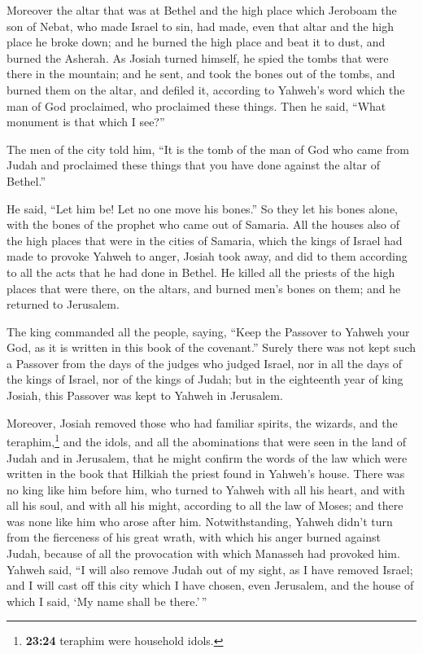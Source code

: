  Moreover the altar that was at Bethel and the high place
which Jeroboam the son of Nebat, who made Israel to sin, had made, even
that altar and the high place he broke down; and he burned the high
place and beat it to dust, and burned the Asherah.  As
Josiah turned himself, he spied the tombs that were there in the
mountain; and he sent, and took the bones out of the tombs, and burned
them on the altar, and defiled it, according to Yahweh's word which the
man of God proclaimed, who proclaimed these things.  Then
he said, ``What monument is that which I see?''

The men of the city told him, ``It is the tomb of the man of God who
came from Judah and proclaimed these things that you have done against
the altar of Bethel.''

 He said, ``Let him be! Let no one move his bones.'' So
they let his bones alone, with the bones of the prophet who came out of
Samaria.  All the houses also of the high places that
were in the cities of Samaria, which the kings of Israel had made to
provoke Yahweh to anger, Josiah took away, and did to them according to
all the acts that he had done in Bethel.  He killed all
the priests of the high places that were there, on the altars, and
burned men's bones on them; and he returned to Jerusalem.

 The king commanded all the people, saying, ``Keep the
Passover to Yahweh your God, as it is written in this book of the
covenant.''  Surely there was not kept such a Passover
from the days of the judges who judged Israel, nor in all the days of
the kings of Israel, nor of the kings of Judah;  but in
the eighteenth year of king Josiah, this Passover was kept to Yahweh in
Jerusalem.

 Moreover, Josiah removed those who had familiar spirits,
the wizards, and the teraphim,\footnote{\textbf{23:24} teraphim were
  household idols.} and the idols, and all the abominations that were
seen in the land of Judah and in Jerusalem, that he might confirm the
words of the law which were written in the book that Hilkiah the priest
found in Yahweh's house.  There was no king like him
before him, who turned to Yahweh with all his heart, and with all his
soul, and with all his might, according to all the law of Moses; and
there was none like him who arose after him. 
Notwithstanding, Yahweh didn't turn from the fierceness of his great
wrath, with which his anger burned against Judah, because of all the
provocation with which Manasseh had provoked him.  Yahweh
said, ``I will also remove Judah out of my sight, as I have removed
Israel; and I will cast off this city which I have chosen, even
Jerusalem, and the house of which I said, `My name shall be there.'\,''

